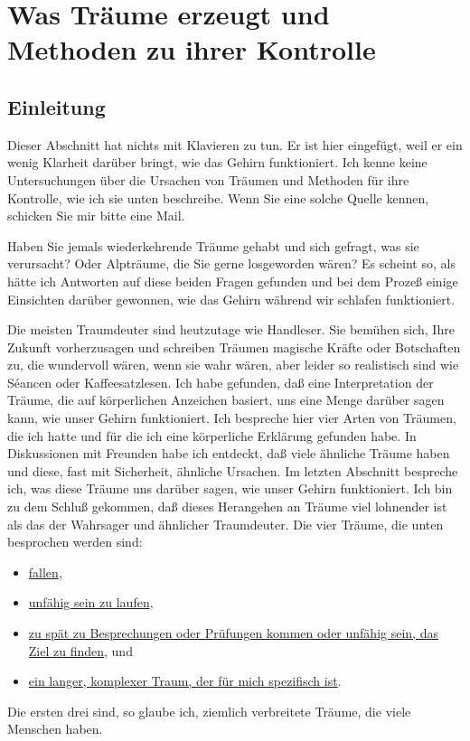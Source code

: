 
\section{Was Träume erzeugt und Methoden zu ihrer Kontrolle}\hypertarget{c3_5}{}

\subsection{Einleitung}\hypertarget{c3_5a}{}

Dieser Abschnitt hat nichts mit Klavieren zu tun.
Er ist hier eingefügt, weil er ein wenig Klarheit darüber bringt, wie das Gehirn funktioniert.
Ich kenne keine Untersuchungen über die Ursachen von Träumen und Methoden für ihre Kontrolle, wie ich sie unten beschreibe.
Wenn Sie eine solche Quelle kennen, schicken Sie mir bitte eine Mail.

Haben Sie jemals wiederkehrende Träume gehabt und sich gefragt, was sie verursacht?
Oder Alpträume, die Sie gerne losgeworden wären?
Es scheint so, als hätte ich Antworten auf diese beiden Fragen gefunden und bei dem Prozeß einige Einsichten darüber gewonnen, wie das Gehirn während wir schlafen funktioniert.

Die meisten Traumdeuter sind heutzutage wie Handleser.
Sie bemühen sich, Ihre Zukunft vorherzusagen und schreiben Träumen magische Kräfte oder Botschaften zu, die wundervoll wären, wenn sie wahr wären, aber leider so realistisch sind wie Séancen oder Kaffeesatzlesen.
Ich habe gefunden, daß eine Interpretation der Träume, die auf körperlichen Anzeichen basiert, uns eine Menge darüber sagen kann, wie unser Gehirn funktioniert.
Ich bespreche hier vier Arten von Träumen, die ich hatte und für die ich eine körperliche Erklärung gefunden habe.
In Diskussionen mit Freunden habe ich entdeckt, daß viele ähnliche Träume haben und diese, fast mit Sicherheit, ähnliche Ursachen.
Im letzten Abschnitt bespreche ich, was diese Träume uns darüber sagen, wie unser Gehirn funktioniert.
Ich bin zu dem Schluß gekommen, daß dieses Herangehen an Träume viel lohnender ist als das der Wahrsager und ähnlicher Traumdeuter.
Die vier Träume, die unten besprochen werden sind:

\begin{itemize} 
 \item \hyperlink{c3_5b}{fallen},
 \item \hyperlink{c3_5c}{unfähig sein zu laufen},
 \item \hyperlink{c3_5d}{zu spät zu Besprechungen oder Prüfungen kommen oder unfähig sein, das Ziel zu finden}, und
 \item \hyperlink{c3_5e}{ein langer, komplexer Traum, der für mich spezifisch ist}.
 \end{itemize}
Die ersten drei sind, so glaube ich, ziemlich verbreitete Träume, die viele Menschen haben.
 

